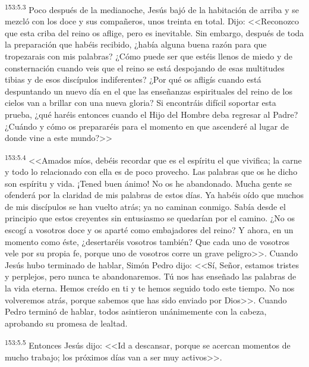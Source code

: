 \par 
\textsuperscript{153:5.3} Poco después de la medianoche, Jesús bajó de la habitación de arriba y se mezcló con los doce y sus compañeros, unos treinta en total. Dijo: <<Reconozco que esta criba del reino os aflige, pero es inevitable. Sin embargo, después de toda la preparación que habéis recibido, ¿había alguna buena razón para que tropezarais con mis palabras? ¿Cómo puede ser que estéis llenos de miedo y de consternación cuando veis que el reino se está despojando de esas multitudes tibias y de esos discípulos indiferentes? ¿Por qué os afligís cuando está despuntando un nuevo día en el que las enseñanzas espirituales del reino de los cielos van a brillar con una nueva gloria? Si encontráis difícil soportar esta prueba, ¿qué haréis entonces cuando el Hijo del Hombre deba regresar al Padre? ¿Cuándo y cómo os prepararéis para el momento en que ascenderé al lugar de donde vine a este mundo?>>

\par 
\textsuperscript{153:5.4} <<Amados míos, debéis recordar que es el espíritu el que vivifica; la carne y todo lo relacionado con ella es de poco provecho. Las palabras que os he dicho son espíritu y vida. ¡Tened buen ánimo! No os he abandonado. Mucha gente se ofenderá por la claridad de mis palabras de estos días. Ya habéis oído que muchos de mis discípulos se han vuelto atrás; ya no caminan conmigo. Sabía desde el principio que estos creyentes sin entusiasmo se quedarían por el camino. ¿No os escogí a vosotros doce y os aparté como embajadores del reino? Y ahora, en un momento como éste, ¿desertaréis vosotros también? Que cada uno de vosotros vele por su propia fe, porque uno de vosotros corre un grave peligro>>. Cuando Jesús hubo terminado de hablar, Simón Pedro dijo: <<Sí, Señor, estamos tristes y perplejos, pero nunca te abandonaremos. Tú nos has enseñado las palabras de la vida eterna. Hemos creído en ti y te hemos seguido todo este tiempo. No nos volveremos atrás, porque sabemos que has sido enviado por Dios>>. Cuando Pedro terminó de hablar, todos asintieron unánimemente con la cabeza, aprobando su promesa de lealtad.

\par 
\textsuperscript{153:5.5} Entonces Jesús dijo: <<Id a descansar, porque se acercan momentos de mucho trabajo; los próximos días van a ser muy activos>>.